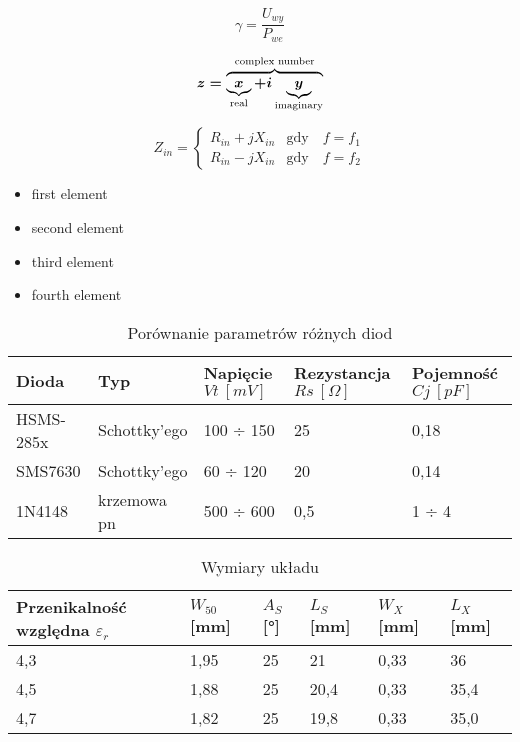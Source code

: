 \begin{equation} \label{eqCzulosc}
\gamma =   \frac{U_{wy}}{P_{we}}
\end{equation}

\begin{equation} \label{test}
\boldmath
z = \overbrace{
    \underbrace{x}_\text{real} + i
    \underbrace{y}_\text{imaginary}
    }^\text{complex number}
\end{equation}

\begin{equation} \label{eqConj1}
Z_{in} = \left\{
  \begin{array}{lr}
    R_{in} + j X_{in} & \text{gdy}\quad f = f_1\\
    R_{in} - j X_{in} & \text{gdy}\quad f = f_2
  \end{array}
\right.
\end{equation}

\begin{itemize}
\item{first element}
\item{second element}
\item{third element}
\item{fourth element}
\end{itemize}

\begin{table}[H]
\centering
\caption{Porównanie parametrów różnych diod}
\label{Tab1}
\small
\begin{tabularx}{\textwidth}{ |X|X|X|X|X| }
\hline
Dioda & Typ & Napięcie\newline$Vt\:[mV]$ & Rezystancja $Rs\:[Ω]$& Pojemność $Cj\:[pF]$ \\
  \hline
HSMS-285x \cite{hsms285x} & Schottky'ego & 100 ÷ 150 & 25 & 0,18 \\
\hline
SMS7630 \cite{sms7630} & Schottky'ego & 60 ÷ 120 & 20 & 0,14 \\
\hline
1N4148 \cite{1n4148} & krzemowa pn & 500 ÷ 600 & 0,5 & 1 ÷ 4 \\
\hline
\end{tabularx}
\end{table}

\begin{table}[H]
\centering
\caption{Wymiary układu}
\label{TabWymiary}
\small
\begin{tabularx}{\textwidth}{ |X|X|X|X|X|X|}
\hline
Przenikalność względna $\varepsilon_r$ & $W_{50}$ [mm] & $A_{S}$ [°]& $L_S$ [mm]& $W_X$ [mm] & $L_X$ [mm] \\
  \hline
4,3 & 1,95 & 25 & 21 & 0,33 & 36\\
  \hline
4,5 & 1,88 & 25 & 20,4  & 0,33 & 35,4\\
  \hline
4,7 & 1,82 & 25 & 19,8 & 0,33 & 35,0\\
\hline
\end{tabularx}
\end{table}
